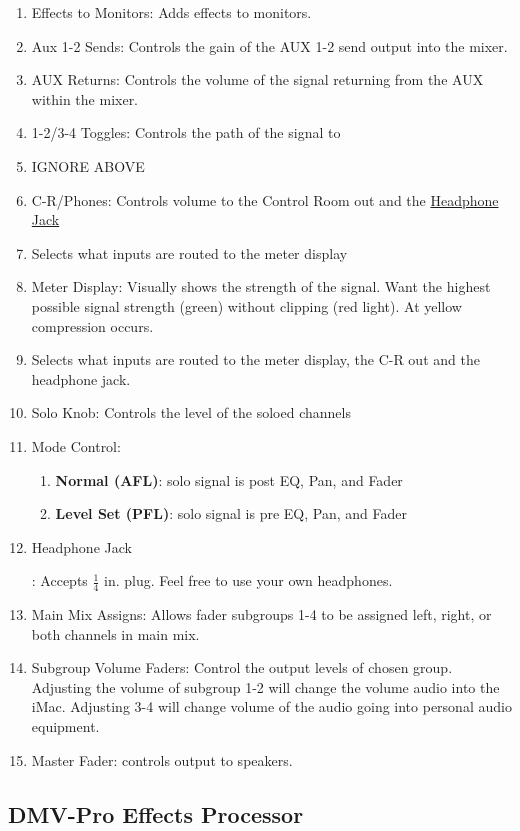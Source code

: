 \documentclass{tufte-book} %
\begin{document}
\begin{enumerate}
	\item Effects to Monitors: Adds effects to monitors. 
	\item Aux 1-2 Sends: Controls the gain of the AUX 1-2 send output into the mixer. 
	\item AUX Returns: Controls the volume of the signal returning from the AUX within the mixer. 
	\item 1-2/3-4 Toggles: Controls the path of the signal to 
	\item IGNORE ABOVE
	\item C-R/Phones: Controls volume to the Control Room out and the \hyperlink{Headphone Jack}{Headphone Jack}
	\item Selects what inputs are routed to the meter display
	\item Meter Display: Visually shows the strength of the signal. Want the highest possible signal strength (green) without clipping (red light). At yellow compression occurs.
	\item Selects what inputs are routed to the meter display, the C-R out and the headphone jack. 
	\item Solo Knob: Controls the level of the soloed channels
	\item Mode Control: 
	\begin{enumerate}
		\item \textbf{Normal (AFL)}: solo signal is post EQ, Pan, and Fader
		\item \textbf{Level Set (PFL)}: solo signal is pre EQ, Pan, and Fader
	\end{enumerate}
	\item \hypertarget{Headphone Jack}{Headphone Jack}: Accepts $\frac{1}{4}$ in. plug. Feel free to use your own headphones. 
	\item Main Mix Assigns: Allows fader subgroups 1-4 to be assigned left, right, or both channels in main mix. 
	\item Subgroup Volume Faders: Control the output levels of chosen group. Adjusting the volume of subgroup 1-2 will change the volume audio into the iMac. Adjusting 3-4 will change volume of the audio going into personal audio equipment. 
	\item Master Fader: controls output to speakers. 
\end{enumerate}

\newpage
\subsection{DMV-Pro Effects Processor}
\end{document}
